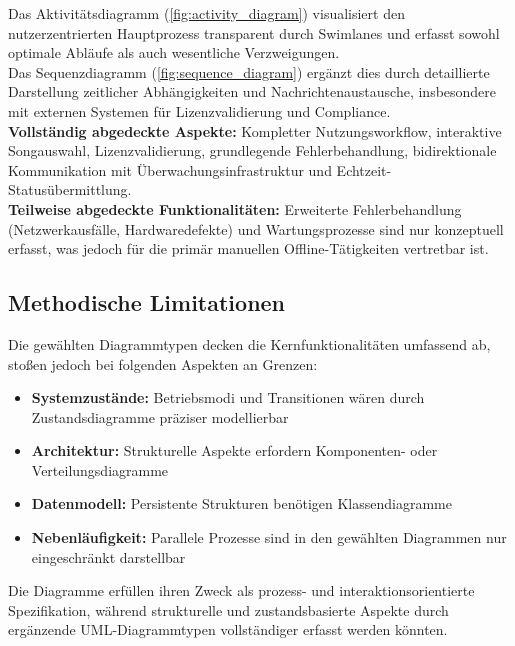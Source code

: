 \documentclass[12pt,oneside]{article}
\begin{document}
Das Aktivitätsdiagramm (\ref{fig:activity_diagram}) visualisiert den nutzerzentrierten Hauptprozess transparent durch Swimlanes und erfasst sowohl optimale Abläufe als auch wesentliche Verzweigungen. \\
Das Sequenzdiagramm (\ref{fig:sequence_diagram}) ergänzt dies durch detaillierte Darstellung zeitlicher Abhängigkeiten und Nachrichtenaustausche, insbesondere mit externen Systemen für Lizenzvalidierung und Compliance.\\
\textbf{Vollständig abgedeckte Aspekte:}
Kompletter Nutzungsworkflow, interaktive Songauswahl, Lizenzvalidierung, grundlegende Fehlerbehandlung, bidirektionale Kommunikation mit Überwachungsinfrastruktur und Echtzeit-Statusübermittlung.\\
\textbf{Teilweise abgedeckte Funktionalitäten:}
Erweiterte Fehlerbehandlung (Netzwerkausfälle, Hardwaredefekte) und Wartungsprozesse sind nur konzeptuell erfasst, was jedoch für die primär manuellen Offline-Tätigkeiten vertretbar ist.

\subsection{Methodische Limitationen}
Die gewählten Diagrammtypen decken die Kernfunktionalitäten umfassend ab, stoßen jedoch bei folgenden Aspekten an Grenzen:
\begin{itemize}
\item \textbf{Systemzustände:} Betriebsmodi und Transitionen wären durch Zustandsdiagramme präziser modellierbar
\item \textbf{Architektur:} Strukturelle Aspekte erfordern Komponenten- oder Verteilungsdiagramme
\item \textbf{Datenmodell:} Persistente Strukturen benötigen Klassendiagramme
\item \textbf{Nebenläufigkeit:} Parallele Prozesse sind in den gewählten Diagrammen nur eingeschränkt darstellbar
\end{itemize}
\noindent
Die Diagramme erfüllen ihren Zweck als prozess- und interaktionsorientierte Spezifikation, während strukturelle und zustandsbasierte Aspekte durch ergänzende UML-Diagrammtypen vollständiger erfasst werden könnten.
\end{document}
